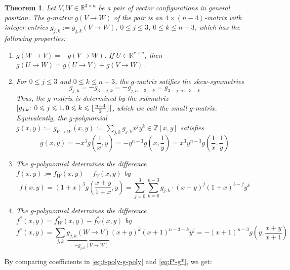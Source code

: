 \documentclass[11pt]{article}
\newtheorem{theorem}{Theorem}
\renewcommand{\leq}{\leqslant}
\newcommand{\R}{\mathbb{R}}
\newcommand{\Z}{\mathbb{Z}}
\DeclarePairedDelimiter\floor{\lfloor}{\rfloor}
\begin{document}
\begin{theorem} 
\label{thm:f-g}
Let $V,W \in \R^{3\times n}$ be a pair of vector configurations in general position. 
%
The \emph{$g$-matrix} $g(V\to W)$ of the pair is an $4\times (n-4)$-matrix  with integer entries $g_{j,k}:=g_{j,k}(V\to W)$, $0\leq j\leq 3$, $0\leq k \leq n-3$, which has the following properties:  
\begin{enumerate}
\item $g(W\to V)=-g(V\to W)$. If $U\in \R^{r\times n}$, then $g(U\to W)=g(U\to V)+g(V\to W)$. 
\item For $0\leq j\leq 3$ and $0\leq k\leq n-3$, the $g$-matrix satifies the skew-symmetries
\begin{equation}
\label{eq:g-skew}
g_{j,k}=-g_{3-j,k}=-g_{j,n-3-k}=g_{3-j,n-3-k}
\end{equation}
Thus, the $g$-matrix is determined by the submatrix $[g_{j,k}\colon 0\leq j \leq 1, 0\leq k \leq \floor{\frac{n-4}{2}}]$, which we call the \emph{small $g$-matrix}. 
Equivalently, the \emph{$g$-polynomial} $g(x,y):=g_{V\to W}(x,y):=\sum_{j,k} g_{j,k} x^j y^k \in \Z[x,y]$ satisfies
\begin{equation}
\label{eq:g-poly-skew}
\textstyle g(x,y)=-x^3g(\frac{1}{x},y)=-y^{n-3}g(x,\frac{1}{y})=x^3y^{n-3}g(\frac{1}{x},\frac{1}{y})
\end{equation}
\item The $g$-polynomial determines the difference $f(x,y):=f_W(x,y)-f_V(x,y)$ by
\begin{equation}
\label{eq:f-poly-g-poly}
f(x,y) = (1+x)^3 g (\textstyle \frac{x+y}{1+x},y)=\sum_{j=0}^3 \sum_{k=0}^{n-3} g_{j,k}\cdot (x+y)^j (1+x)^{3-j} y^k
\end{equation}
\item The $g$-polynomial determines the difference $f^*(x,y)=f^*_W(x,y)-f^*_V(x,y)$ by
\begin{equation}
\label{eq:f*-g*}
\textstyle f^*(x,y) = \sum_{j,k} \underbrace{g_{j,k}(W \to V)}_{=-g_{j,k}(V \to W)} (x+y)^k (x+1)^{n-3-k} y^j = -(x+1)^{n-3} g(y,\frac{x+y}{x+1})
\end{equation}
%
\end{enumerate}
\end{theorem}
By comparing coefficients in \eqref{eq:f-poly-g-poly} and \eqref{eq:f*-g*}, we get:
\end{document}
